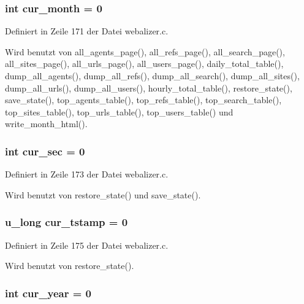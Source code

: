 \subsubsection{\setlength{\rightskip}{0pt plus 5cm}int {\bf cur\_\-month} = 0}\label{webalizer_8c_d8ec6498bcc8d8eb82d92bc5c1aacc8d}




Definiert in Zeile 171 der Datei webalizer.c.

Wird benutzt von all\_\-agents\_\-page(), all\_\-refs\_\-page(), all\_\-search\_\-page(), all\_\-sites\_\-page(), all\_\-urls\_\-page(), all\_\-users\_\-page(), daily\_\-total\_\-table(), dump\_\-all\_\-agents(), dump\_\-all\_\-refs(), dump\_\-all\_\-search(), dump\_\-all\_\-sites(), dump\_\-all\_\-urls(), dump\_\-all\_\-users(), hourly\_\-total\_\-table(), restore\_\-state(), save\_\-state(), top\_\-agents\_\-table(), top\_\-refs\_\-table(), top\_\-search\_\-table(), top\_\-sites\_\-table(), top\_\-urls\_\-table(), top\_\-users\_\-table() und write\_\-month\_\-html().
\subsubsection{\setlength{\rightskip}{0pt plus 5cm}int {\bf cur\_\-sec} = 0}\label{webalizer_8c_a2131c365f9da2fb93a57aed95b563d8}




Definiert in Zeile 173 der Datei webalizer.c.

Wird benutzt von restore\_\-state() und save\_\-state().
\subsubsection{\setlength{\rightskip}{0pt plus 5cm}u\_\-long {\bf cur\_\-tstamp} = 0}\label{webalizer_8c_4327980462d3207e34bf99fce007b511}




Definiert in Zeile 175 der Datei webalizer.c.

Wird benutzt von restore\_\-state().
\subsubsection{\setlength{\rightskip}{0pt plus 5cm}int {\bf cur\_\-year} = 0}\label{webalizer_8c_8447667f9dc8021c4f17284b9a12f776}




